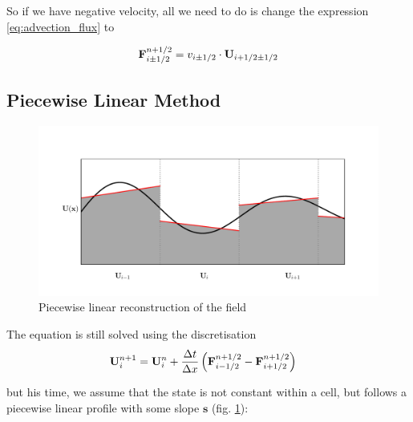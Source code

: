So if we have negative velocity, all we need to do is change the expression \ref{eq:advection_flux} to

\begin{equation}
	\mathbf{F}_{i\pm1/2}^{n+1/2} = v_{i\pm1/2}\cdot \mathbf{U}_{i + 1/2 \pm 1/2}
\end{equation}

















\subsection{Piecewise Linear Method}\label{chap:advection-pwlin}

\begin{figure}[htbp]
	\includegraphics[width=\textwidth]{./figures/piecewise_linear.pdf}%
	\caption{Piecewise linear reconstruction of the field
		\label{fig:pwlin}
	}
\end{figure}


The equation is still solved using the discretisation
\begin{align}
	\mathbf{U}_i ^{n+1} &= 
		\mathbf{U}_i^{n} +  \frac{\Delta t}{\Delta x} \left( \mathbf{F}_{i-1/2}^{n+1/2} - \mathbf{F}_{i+1/2}^{n+1/2} \right) \label{eq:advection_basic_pwlin}
\end{align}

but his time, we assume that the state is not constant within a cell, but follows a piecewise linear profile with some slope $\mathbf{s}$ (fig. \ref{fig:pwlin}):

